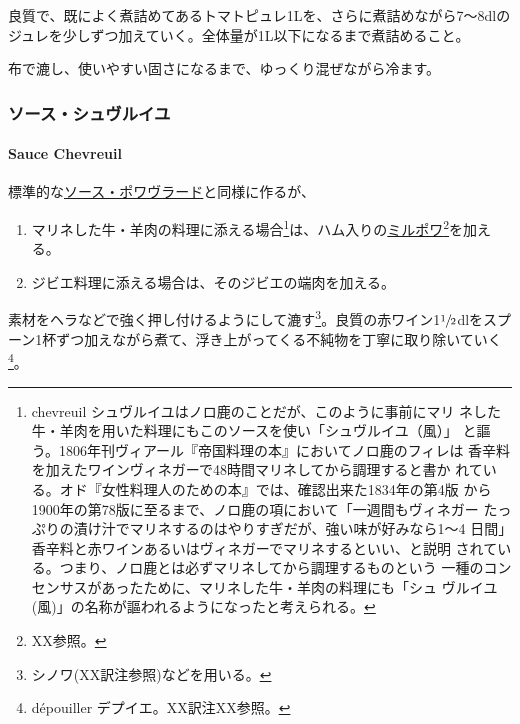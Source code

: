 \documentclass[twoside,12Q,b5j]{escoffierltjsbook}
\newenvironment{recette}{\begin{small}\begin{spacing}{1}\begin{multicols}{2}}{\end{multicols}\end{spacing}\end{small}}
\begin{document}
\begin{recette}
良質で、既によく煮詰めてあるトマトピュレ1Lを、さらに煮詰めながら7〜8dlのジュレを少しずつ加えていく。全体量が1L以下になるまで煮詰めること。

布で漉し、使いやすい固さになるまで、ゆっくり混ぜながら冷ます。

\vspace*{1.7\zw}

\subsubsection{ソース・シュヴルイユ}\label{ux30bdux30fcux30b9ux30b7ux30e5ux30f4ux30ebux30a4ux30e6}

\paragraph{Sauce Chevreuil}\label{sauce-chevreuil}


標準的な\protect\hyperlink{sauce-poivrade}{ソース・ポワヴラード}と同様に作るが、

\begin{enumerate}
\def\labelenumi{\arabic{enumi}.}
\item
  マリネした牛・羊肉の料理に添える場合\footnote{chevreuil
    シュヴルイユはノロ鹿のことだが、このように事前にマリ
    ネした牛・羊肉を用いた料理にもこのソースを使い「シュヴルイユ（風）」
    と謳う。1806年刊ヴィアール『帝国料理の本』においてノロ鹿のフィレは
    香辛料を加えたワインヴィネガーで48時間マリネしてから調理すると書か
    れている。オド『女性料理人のための本』では、確認出来た1834年の第4版
    から1900年の第78版に至るまで、ノロ鹿の項において「一週間もヴィネガー
    たっぷりの漬け汁でマリネするのはやりすぎだが、強い味が好みなら1〜4
    日間」香辛料と赤ワインあるいはヴィネガーでマリネするといい、と説明
    されている。つまり、ノロ鹿とは必ずマリネしてから調理するものという
    一種のコンセンサスがあったために、マリネした牛・羊肉の料理にも「シュ
    ヴルイユ(風)」の名称が謳われるようになったと考えられる。}は、ハム入りの\protect\hyperlink{mirepoix}{ミルポワ}\footnote{XX参照。}を加える。
\item
  ジビエ料理に添える場合は、そのジビエの端肉を加える。
\end{enumerate}

素材をヘラなどで強く押し付けるようにして漉す\footnote{シノワ(XX訳注参照)などを用いる。}。良質の赤ワイン1\(\sfrac{1}{2}\)dlをスプーン1杯ずつ加えながら煮て、浮き上がってくる不純物を丁寧に取り除いていく\footnote{dépouiller
  デプイエ。XX訳注XX参照。}。


\end{recette}
\end{document}
